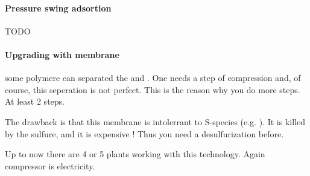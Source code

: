 \documentclass[10pt,a4paper]{article}
\begin{document}
\paragraph{Pressure swing adsortion}
TODO
\paragraph{Upgrading with membrane}some polymere can separated the  and . One needs a step of compression and, of course, this seperation is not perfect. This is the reason why you do more steps. At least 2 steps.

The drawback is that this membrane is intolerrant to S-species (e.g. ). It is killed by the sulfure, and it is expensive ! Thus you need a desulfurization before.

Up to now there are 4 or 5 plants working with this technology. Again compressor is electricity.

\newpage




\end{document}
